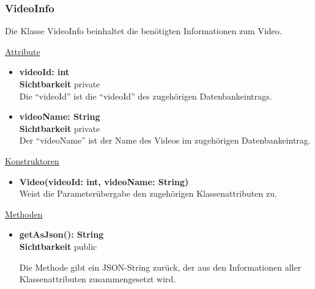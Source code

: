 \subsubsection{VideoInfo} \label{service:klasse:VideoInfo}
Die Klasse VideoInfo beinhaltet die benötigten Informationen zum Video.\newline

\underline{Attribute}
\begin{itemize}
\itemsep0pt
\item \textbf{videoId: int} \hfill\\ 
\textbf{Sichtbarkeit} private \hfill\\  

Die ``videoId'' ist die ``videoId'' des zugehörigen Datenbankeintrags.

\item \textbf{videoName: String} \hfill\\ 
\textbf{Sichtbarkeit} private \hfill\\ 

Der ``videoName'' ist der Name des Videos im zugehörigen Datenbankeintrag.

\end{itemize}

\underline{Konstruktoren}
\begin{itemize}
\itemsep0pt
\item \textbf{Video(videoId: int, videoName: String)} \hfill\\

Weist die Parameterübergabe den zugehörigen Klassenattributen zu.

\end{itemize}

\underline{Methoden}
\begin{itemize}
\itemsep0pt
\item \textbf{getAsJson(): String}\hfill\\
\textbf{Sichtbarkeit} public

Die Methode gibt ein JSON-String zurück, der aus den Informationen aller Klassenattributen zusammengesetzt wird.

\end{itemize}